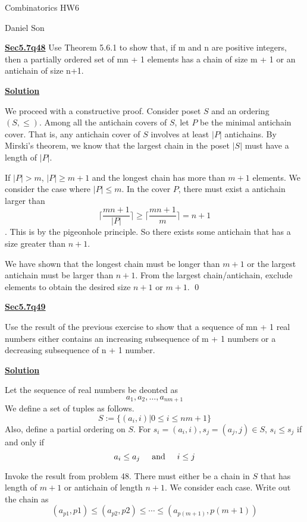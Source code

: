 \documentclass{article}
\newcommand{\new}[1]{
    \vspace{2mm}
    \noindent
    \textbf{
    \underline{#1}}
}
\newcommand{\textAnd}{
    {
        \hspace{5mm}
        \textrm{and}
        \hspace{5mm}
    }
}
\begin{document}
\begin{center}
\LARGE
Combinatorics HW6

\Large
Daniel Son
\end{center}

\normalsize 

\new{Sec5.7q48} Use Theorem 5.6.1 to show that, if m and n are positive integers, then a partially 
ordered set of mn + 1 elements has a chain of size m + 1 or an antichain of size 
n+1. 

\new{Solution} 
We proceed with a constructive proof. 
Consider poset $S$ and an ordering $(S, \leq)$. 
Among all the antichain covers of $S$, let $P$ be the minimal 
antichain cover. That is, any antichain cover of $S$ involves 
at least $|P|$ antichains. By Mirski's theorem, we know 
that the largest chain in the poset $|S|$ must have a length 
of $|P|$. 

If $|P| > m$, $|P| \geq m + 1$ and the longest chain has 
more than $m + 1$ elements. We consider the case where 
$|P| \leq m$. In the cover $P$, there must exist a antichain 
larger than
\[
    \bigg\lceil 
    \frac{mn + 1}{|P|}
    \bigg\rceil
    \geq 
    \bigg\lceil 
    \frac{mn + 1}{m}
    \bigg\rceil
    = n + 1
\]
. This is by the pigeonhole principle. 
So there exists some antichain that has a size greater than 
$n + 1$. 

We have shown that the longest chain must be longer than $m + 1$
or the largest antichain must be larger than $n + 1$. From the largest 
chain/antichain, exclude elements to obtain the desired size $n+1$
or $m +1$.  \hfill \qed


\new{Sec5.7q49} 
Use the result of the previous exercise to show that a sequence of mn + 1 real 
numbers either contains an increasing subsequence of m + 1 numbers or a decreasing subsequence of n + 1 number. 

\new{Solution}
Let the sequence of real numbers be deonted as 
\[
    a_1, a_2, \dots, a_{nm + 1}
\]
We define a set of tuples as follows. 
\[
    S := \{(a_i, i)| 0 \leq i \leq nm + 1\}
\]
Also, define a partial ordering on $S$. 
For $s_i = (a_i, i), s_j = (a_j, j) \in S$, $s_i \leq s_j$ if and only if 
\[
    a_i \leq a_j \textAnd i \leq j
\]

Invoke the result from problem 48. There must either be 
a chain in $S$ that has length of $m + 1$ or antichain of 
length $n + 1$. We consider each case. Write out the chain 
as 
\[
    (a_{p1}, p1) \leq (a_{p2}, p2) \leq \cdots \leq (a_{p(m+1)}, p(m+1))
\]
\end{document}
